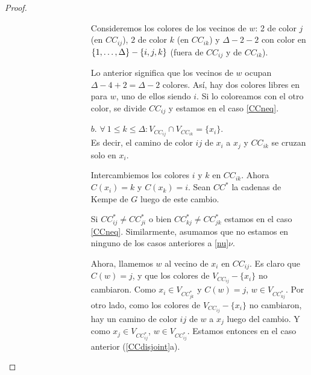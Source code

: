 \begin{proof}
\begin{enumerate}
\begin{enumerate}
\begin{enumerate}
\begin{itemize}
\begin{enumerate}
\begin{itemize}
            Consideremos los colores de los vecinos de $w$: 2 de color $j$ (en $CC_{ij}$), $2$ de color $k$ (en $CC_{ik}$) y $\Delta - 2 - 2$ con color en $\{1, \mathellipsis, \Delta\} - \{i, j, k\}$ (fuera de $CC_{ij}$ y de $CC_{ik}$).
            
            Lo anterior significa que los vecinos de $w$ ocupan $\Delta - 4 + 2 = \Delta - 2$ colores. Así, hay dos colores libres en para $w$, uno de ellos siendo $i$. Si lo coloreamos con el otro color, se divide $CC_{ij}$ y estamos en el caso \ref{CCneq}.

    \item[$b.$] $\forall~ 1 \le k \le \Delta \colon V_{CC_{ij}} \cap V_{CC_{ik}} = \{x_i\}$.\\
    Es decir, el camino de color $ij$ de $x_i$ a $x_j$ y $CC_{ik}$ se cruzan solo en $x_i$.
    
    Intercambiemos los colores $i$ y $k$ en $CC_{ik}$.  Ahora $C(x_i) = k$ y $C(x_k) = i$. Sean $CC^{*}$ la cadenas de Kempe de $G$ luego de este cambio.
    
    Si $CC_{ij}^{*} \ne CC_{ji}^{*}$ o bien $CC_{kj}^{*} \neq CC_{jk}^{*}$ estamos en el caso \ref{CCneq}. Similarmente, asumamos que no estamos en ninguno de los casos anteriores a \ref{nu}$\nu$.
    
    Ahora, llamemos $w$ al vecino de $x_i$ en $CC_{ij}$. Es claro que $C(w) = j$, y que los colores de $V_{CC_{ij}} - \{x_i\}$ no cambiaron. Como $x_i \in V_{CC_{jk}^{*}}$ y $C(w) = j$, $w \in V_{CC_{kj}^{*}}$. Por otro lado, como los colores de $V_{CC_{ij}} - \{x_i\}$ no cambiaron, hay un camino de color $ij$ de $w$ a $x_j$ luego del cambio. Y como $x_j \in V_{CC_{ij}^{*}}$, $w \in V_{CC_{ij}^{*}}$. Estamos entonces en el caso anterior (\ref{CCdisjoint}a).
\end{itemize}
\end{enumerate}
\end{itemize}
\end{enumerate}
\end{enumerate}
\end{enumerate}
\end{proof}
